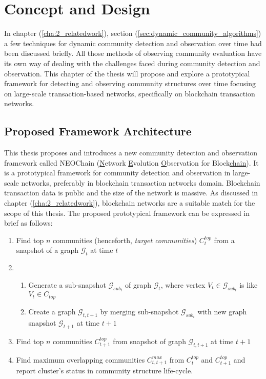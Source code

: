 \chapter{Concept and Design}\label{cha:3_concept_and_design}
In chapter (\ref{cha:2_relatedwork}), section (\ref{sec:dynamic_community_algorithms}) a few techniques for dynamic community detection and observation over time had been discussed briefly. All those methods of observing community evaluation have its own way of dealing with the challenges faced during community detection and observation. This chapter of the thesis will propose and explore a prototypical framework for detecting and observing community structures over time focusing on large-scale transaction-based networks, specifically on blockchain transaction networks.

\section{Proposed Framework Architecture}\label{sec:framework}
This thesis proposes and introduces a new community detection and observation framework called NEOChain (\underline{N}etwork \underline{E}volution \underline{O}bservation for Block\underline{chain}). It is a prototypical framework for community detection and observation in large-scale networks, preferably in blockchain transaction networks domain. Blockchain transaction data is public and the size of the network is massive. As discussed in chapter (\ref{cha:2_relatedwork}), blockchain networks are a suitable match for the scope of this thesis. The proposed prototypical framework can be expressed in brief as follows:

\begin{enumerate}[label=(\roman*)]
\item Find top $n$ communities (henceforth, \textit{target communities}) $C_t^{top}$ from a snapshot of a graph $\mathcal{G}_t$ at time $t$
\item
\begin{enumerate}
	\item Generate a sub-snapshot $\mathcal{G}_{sub_{t}}$ of graph $\mathcal{G}_t$, where vertex $V_t 		\in \mathcal{G}_{sub_{t}}$ is like $V_t \in C_{top}$ 
	\item Create a graph $\mathcal{G}_{t, t+1}$ by merging sub-snapshot $\mathcal{G}_{sub_{t}}$ with 		new graph snapshot $\mathcal{G}_{t+1}$ at time $t+1$
\end{enumerate}
\item Find top $n$ communities $C_{t+1}^{top}$ from snapshot of graph $\mathcal{G}_{t, t+1}$ at time $t+1$
\item Find maximum overlapping communities $C_{t, t+1}^{max}$ from $C_t^{top}$ and $C_{t+1}^{top}$ and report cluster's status in community structure life-cycle.
\end{enumerate}

